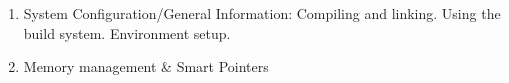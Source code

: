 \documentclass[11pt,a4paper,english]{article}
\begin{document}
  \blindtext
  \begin{enumerate}[label={Lecture \arabic* -- },leftmargin=*]
    \item System Configuration/General Information: Compiling and linking. Using the build system. Environment setup.
    \item Memory management \& Smart Pointers
  \end{enumerate}
\end{document}
